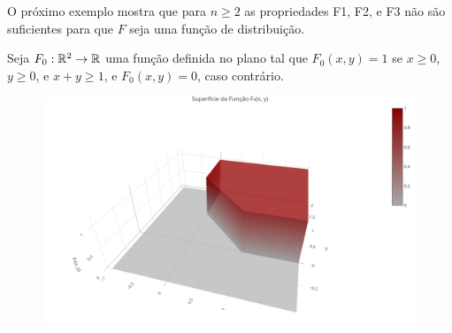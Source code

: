 \begin{frame}
O próximo exemplo mostra que para $n\geq 2$ as propriedades F1, F2, e F3 não são suficientes para que $F$ seja uma função de distribuição.
\begin{exem}
Seja $F_0:\mathbb{R}^2 \rightarrow\mathbb{R}$ uma função definida no plano tal que $F_0(x,y)=1$ se $x\geq 0$, $y\geq 0$, e $x+y\geq 1$, e $F_0(x,y)=0$, caso contrário.


\begin{figure}[!htb]
	\begin{center}
			\includegraphics[scale=0.2]{F0.png}
		\end{center}
\end{figure}

\end{exem}
\end{frame}

